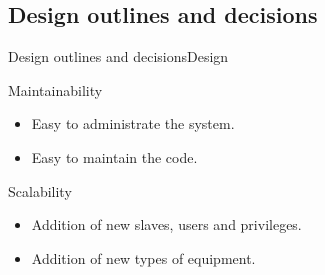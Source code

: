 \subsection{Design outlines and decisions}
\begin{frame}{Design outlines and decisions}{Design}
  \begin{block}{Maintainability}
  	\begin{itemize}
  		\item Easy to administrate the system.
  		\item Easy to maintain the code.
  	\end{itemize}
  \end{block}

  \begin{block}{Scalability}
  	\begin{itemize}
  		\item Addition of new slaves, users and privileges.
  		\item Addition of new types of equipment.
  	\end{itemize}
  \end{block}
\end{frame}

